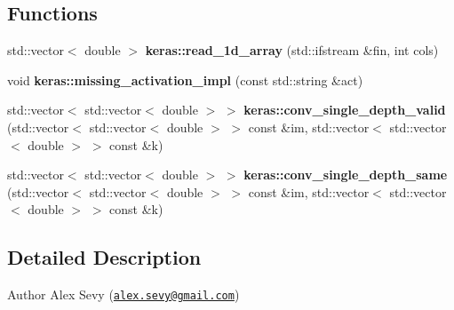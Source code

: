 \subsection*{Functions}
\begin{DoxyCompactItemize}
\item 
\mbox{\label{keras__model_8hh_a6b43ddee6f64595677882a9ae961b0da}} 
std\+::vector$<$ double $>$ {\bfseries keras\+::read\+\_\+1d\+\_\+array} (std\+::ifstream \&fin, int cols)
\item 
\mbox{\label{keras__model_8hh_a948440df9f6844f310cc1d7daad9d272}} 
void {\bfseries keras\+::missing\+\_\+activation\+\_\+impl} (const std\+::string \&act)
\item 
\mbox{\label{keras__model_8hh_ab983d8674630469e83a6a35af24878ce}} 
std\+::vector$<$ std\+::vector$<$ double $>$ $>$ {\bfseries keras\+::conv\+\_\+single\+\_\+depth\+\_\+valid} (std\+::vector$<$ std\+::vector$<$ double $>$ $>$ const \&im, std\+::vector$<$ std\+::vector$<$ double $>$ $>$ const \&k)
\item 
\mbox{\label{keras__model_8hh_af53deeb6d620e697a4eeea3bde2c7153}} 
std\+::vector$<$ std\+::vector$<$ double $>$ $>$ {\bfseries keras\+::conv\+\_\+single\+\_\+depth\+\_\+same} (std\+::vector$<$ std\+::vector$<$ double $>$ $>$ const \&im, std\+::vector$<$ std\+::vector$<$ double $>$ $>$ const \&k)
\end{DoxyCompactItemize}


\subsection{Detailed Description}
\begin{DoxyAuthor}{Author}
Alex Sevy (\href{mailto:alex.sevy@gmail.com}{\tt alex.\+sevy@gmail.\+com}) 
\end{DoxyAuthor}
